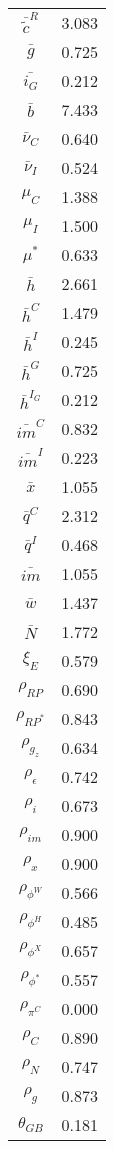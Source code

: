 \begin{center}
\begin{longtable}{cc}
$\bar{\tilde{c}}^R$ 	 & 	 3.083 \\
$\bar{g}$ 	 & 	 0.725 \\
$\bar{i_G}$ 	 & 	 0.212 \\
$\bar{b}$ 	 & 	 7.433 \\
$\bar{\nu}_C$ 	 & 	 0.640 \\
$\bar{\nu}_I$ 	 & 	 0.524 \\
$\mu_C$ 	 & 	 1.388 \\
$\mu_I$ 	 & 	 1.500 \\
$\mu^*$ 	 & 	 0.633 \\
$\bar{h}$ 	 & 	 2.661 \\
$\bar{h}^C$ 	 & 	 1.479 \\
$\bar{h}^I$ 	 & 	 0.245 \\
$\bar{h}^G$ 	 & 	 0.725 \\
$\bar{h}^{I_G}$ 	 & 	 0.212 \\
$\bar{im}^C$ 	 & 	 0.832 \\
$\bar{im}^I$ 	 & 	 0.223 \\
$\bar{x}$ 	 & 	 1.055 \\
$\bar{q}^C$ 	 & 	 2.312 \\
$\bar{q}^I$ 	 & 	 0.468 \\
$\bar{im}$ 	 & 	 1.055 \\
$\bar{w}$ 	 & 	 1.437 \\
$\bar{N}$ 	 & 	 1.772 \\
$\xi_E$ 	 & 	 0.579 \\
$\rho_{RP}$ 	 & 	 0.690 \\
$\rho_{RP^*}$ 	 & 	 0.843 \\
$\rho_{g_z}$ 	 & 	 0.634 \\
$\rho_{\epsilon}$ 	 & 	 0.742 \\
$\rho_{i}$ 	 & 	 0.673 \\
$\rho_{im}$ 	 & 	 0.900 \\
$\rho_{x}$ 	 & 	 0.900 \\
$\rho_{\phi^W}$ 	 & 	 0.566 \\
$\rho_{\phi^H}$ 	 & 	 0.485 \\
$\rho_{\phi^X}$ 	 & 	 0.657 \\
$\rho_{\phi^*}$ 	 & 	 0.557 \\
$\rho_{\pi^C}$ 	 & 	 0.000 \\
$\rho_{C}$ 	 & 	 0.890 \\
$\rho_{N}$ 	 & 	 0.747 \\
$\rho_{g}$ 	 & 	 0.873 \\
$\theta_{GB}$ 	 & 	 0.181 \\

\end{longtable}
\end{center}
